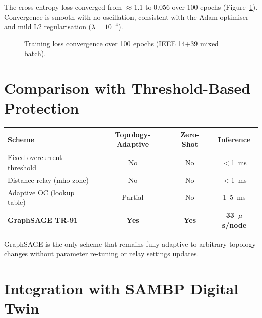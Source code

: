 \documentclass[11pt,a4paper]{article}
\begin{document}
The cross-entropy loss converged from $\approx$1.1 to 0.056 over 100 epochs
(Figure~\ref{fig:loss}).  Convergence is smooth with no oscillation,
consistent with the Adam optimiser and mild L2 regularisation ($\lambda=10^{-4}$).

\begin{figure}[h]
\centering
{}
\caption{Training loss convergence over 100 epochs (IEEE 14+39 mixed batch).}
\label{fig:loss}
\end{figure}

\section{Comparison with Threshold-Based Protection}
\label{sec:comparison}

\begin{center}
\begin{tabular}{lccc}
\toprule
Scheme & Topology-Adaptive & Zero-Shot & Inference \\
\midrule
Fixed overcurrent threshold  & No  & No  & $<$1~ms \\
Distance relay (mho zone)    & No  & No  & $<$1~ms \\
Adaptive OC (lookup table)   & Partial & No & 1--5~ms \\
\textbf{GraphSAGE TR-91}     & \textbf{Yes} & \textbf{Yes} & \textbf{33~$\mu$s/node} \\
\bottomrule
\end{tabular}
\end{center}

GraphSAGE is the only scheme that remains fully adaptive to arbitrary topology
changes without parameter re-tuning or relay settings updates.

\section{Integration with SAMBP Digital Twin}
\label{sec:integration}
\end{document}
